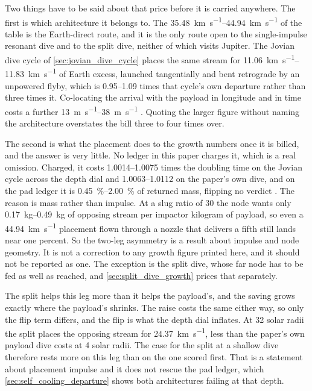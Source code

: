 \documentclass{article}
\begin{document}
Two things have to be said about that price before it is carried anywhere. The first is which architecture it belongs to. The \SIrange{35.48}{44.94}{\kilo\meter\per\second} of the table is the Earth-direct route, and it is the only route open to the single-impulse resonant dive and to the split dive, neither of which visits Jupiter. The Jovian dive cycle of \autoref{sec:jovian_dive_cycle} places the same stream for \SIrange{11.06}{11.83}{\kilo\meter\per\second} of Earth excess, launched tangentially and bent retrograde by an unpowered flyby, which is \numrange{0.95}{1.09} times that cycle's own departure rather than three times it. Co-locating the arrival with the payload in longitude and in time costs a further \SIrange{13}{38}{\meter\per\second} \cite{Katz_aim_is_all_you_need_2025}. Quoting the larger figure without naming the architecture overstates the bill three to four times over.

The second is what the placement does to the growth numbers once it is billed, and the answer is very little. No ledger in this paper charges it, which is a real omission. Charged, it costs \numrange{1.0014}{1.0075} times the doubling time on the Jovian cycle across the depth dial and \numrange{1.0063}{1.0112} on the paper's own dive, and on the pad ledger it is \SIrange{0.45}{2.00}{\percent} of returned mass, flipping no verdict \cite{Katz_aim_is_all_you_need_2025}. The reason is mass rather than impulse. At a slug ratio of 30 the node wants only \SIrange{0.17}{0.49}{\kilogram} of opposing stream per impactor kilogram of payload, so even a \SI{44.94}{\kilo\meter\per\second} placement flown through a nozzle that delivers a fifth still lands near one percent. So the two-leg asymmetry is a result about impulse and node geometry. It is not a correction to any growth figure printed here, and it should not be reported as one. The exception is the split dive, whose far node has to be fed as well as reached, and \autoref{sec:split_dive_growth} prices that separately.

The split helps this leg more than it helps the payload's, and the saving grows exactly where the payload's shrinks. The raise costs the same either way, so only the flip term differs, and the flip is what the depth dial inflates. At 32 solar radii the split places the opposing stream for \SI{24.37}{\kilo\meter\per\second}, less than the paper's own payload dive costs at 4 solar radii. The case for the split at a shallow dive therefore rests more on this leg than on the one scored first. That is a statement about placement impulse and it does not rescue the pad ledger, which \autoref{sec:self_cooling_departure} shows both architectures failing at that depth.
\end{document}
